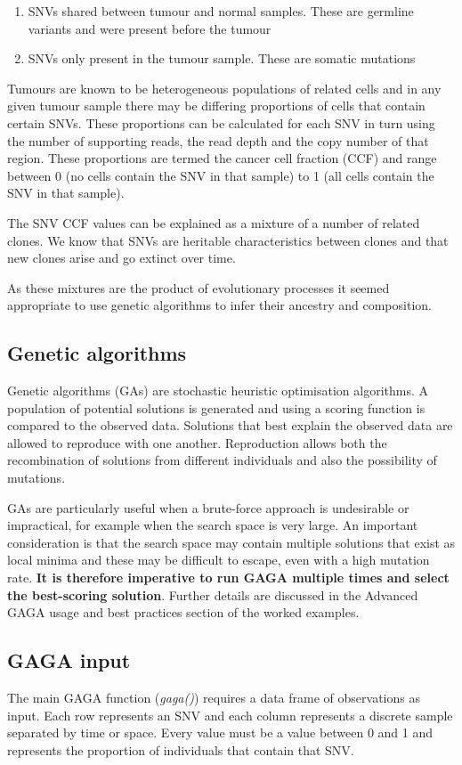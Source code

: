 \documentclass[a4paper]{article}\usepackage[]{graphicx}\usepackage[]{color}
\begin{document}
\begin{enumerate}
   \item SNVs shared between tumour and normal samples.  These are germline variants and were present before the tumour
   \item SNVs only present in the tumour sample.  These are somatic mutations
\end{enumerate}

Tumours are known to be heterogeneous populations of related cells and in any given tumour sample there may be differing proportions of cells that contain certain SNVs.  These proportions can be calculated for each SNV in turn using the number of supporting reads, the read depth and the copy number of that region.  These proportions are termed the cancer cell fraction (CCF) and range between 0 (no cells contain the SNV in that sample) to 1 (all cells contain the SNV in that sample).

The SNV CCF values can be explained as a mixture of a number of related clones.  We know that SNVs are heritable characteristics between clones and that new clones arise and go extinct over time.

As these mixtures are the product of evolutionary processes it seemed appropriate to use genetic algorithms to infer their ancestry and composition.

\subsection{Genetic algorithms}
Genetic algorithms (GAs) are stochastic heuristic optimisation algorithms.  A population of potential solutions is generated and using a scoring function is compared to the observed data.  Solutions that best explain the observed data are allowed to reproduce with one another.  Reproduction allows both the recombination of solutions from different individuals and also the possibility of mutations.

GAs are particularly useful when a brute-force approach is undesirable or impractical, for example when the search space is very large.  An important consideration is that the search space may contain multiple solutions that exist as local minima and these may be difficult to escape, even with a high mutation rate.  \textbf{It is therefore imperative to run GAGA multiple times and select the best-scoring solution}.  Further details are discussed in the Advanced GAGA usage and best practices section of the worked examples.

\subsection{GAGA input}
The main GAGA function (\emph{gaga()}) requires a data frame of observations as input.  Each row represents an SNV and each column represents a discrete sample separated by time or space. Every value must be a value between 0 and 1 and represents the proportion of individuals that contain that SNV.
\end{document}
